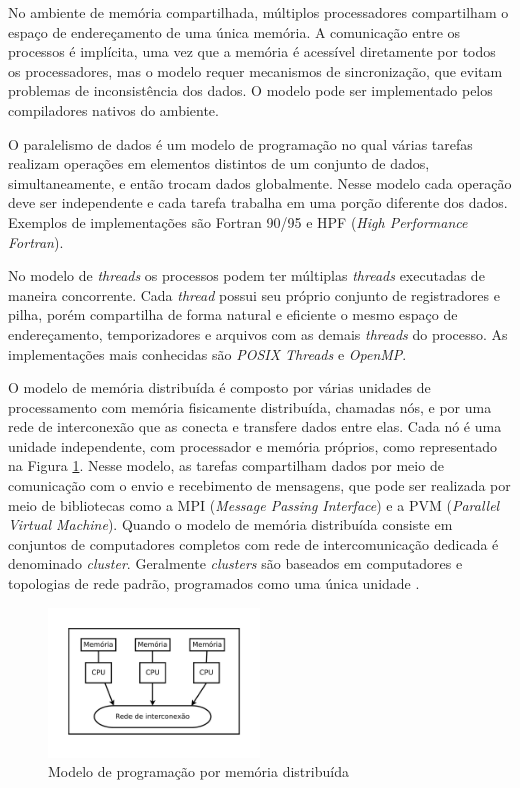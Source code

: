 No ambiente de memória compartilhada, múltiplos processadores compartilham o espaço de endereçamento de uma única memória. A comunicação entre os processos é implícita, uma vez que a memória é acessível diretamente por todos os processadores, mas o modelo requer mecanismos de sincronização, que evitam problemas de inconsistência dos dados. O modelo pode ser implementado pelos compiladores nativos do ambiente.

O paralelismo de dados é um modelo de programação no qual várias tarefas realizam operações em elementos distintos de um conjunto de dados, simultaneamente, e então trocam dados globalmente. Nesse modelo cada operação deve ser independente e cada tarefa trabalha em uma porção diferente dos dados. Exemplos de implementações são Fortran 90/95 e HPF (\textit{High Performance Fortran}).

No modelo de \textit{threads} os processos podem ter múltiplas \textit{threads} executadas de maneira concorrente. Cada \textit{thread} possui seu próprio conjunto de registradores e pilha, porém compartilha de forma natural e eficiente o mesmo espaço de endereçamento, temporizadores e arquivos com as demais \textit{threads} do processo. As implementações mais conhecidas são \textit{POSIX Threads} e \textit{OpenMP}.

O modelo de memória distribuída é composto por várias unidades de processamento  com memória fisicamente distribuída, chamadas nós, e por uma rede de interconexão que as conecta e transfere dados entre elas. 
Cada nó é uma unidade independente, com processador e memória próprios, como representado na Figura \ref{fig:ArquiteturaDistribuida}. 
Nesse modelo, as tarefas compartilham dados por meio de comunicação com o envio e recebimento de mensagens, que pode ser realizada por meio de bibliotecas como a MPI (\textit{Message Passing Interface}) e a PVM (\textit{Parallel Virtual Machine}).
Quando o modelo de memória distribuída consiste em conjuntos de computadores completos com rede de intercomunicação dedicada é denominado \textit{cluster}. Geralmente \textit{clusters} são baseados em computadores e topologias de rede padrão, programados como uma única unidade \cite{Rauber:2010}.


\begin{figure}[htb]
\centering
\includegraphics[trim=0cm 1cm 0cm 0cm, width=0.5\textwidth]{figuras/Arquitetura.pdf}
\caption{Modelo de programação por memória distribuída}
\label{fig:ArquiteturaDistribuida}
\end{figure}


